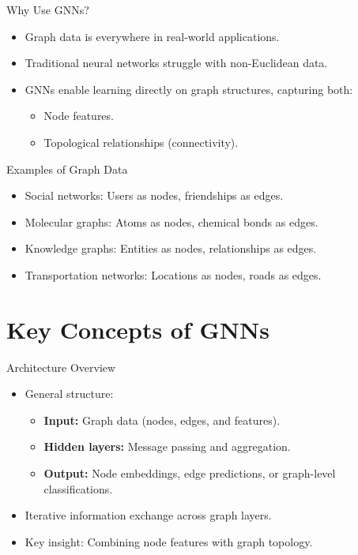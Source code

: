\documentclass{beamer}
\begin{document}
\begin{frame}{Why Use GNNs?}
    \begin{itemize}
        \item Graph data is everywhere in real-world applications.
        \item Traditional neural networks struggle with non-Euclidean data.
        \item GNNs enable learning directly on graph structures, capturing both:
        \begin{itemize}
            \item Node features.
            \item Topological relationships (connectivity).
        \end{itemize}
    \end{itemize}
\end{frame}

\begin{frame}{Examples of Graph Data}
    \begin{itemize}
        \item Social networks: Users as nodes, friendships as edges.
        \item Molecular graphs: Atoms as nodes, chemical bonds as edges.
        \item Knowledge graphs: Entities as nodes, relationships as edges.
        \item Transportation networks: Locations as nodes, roads as edges.
    \end{itemize}
\end{frame}

\section{Key Concepts of GNNs}

\begin{frame}{Architecture Overview}
    \begin{itemize}
        \item General structure:
        \begin{itemize}
            \item \textbf{Input:} Graph data (nodes, edges, and features).
            \item \textbf{Hidden layers:} Message passing and aggregation.
            \item \textbf{Output:} Node embeddings, edge predictions, or graph-level classifications.
        \end{itemize}
        \item Iterative information exchange across graph layers.
        \item Key insight: Combining node features with graph topology.
    \end{itemize}
\end{frame}
\end{document}
